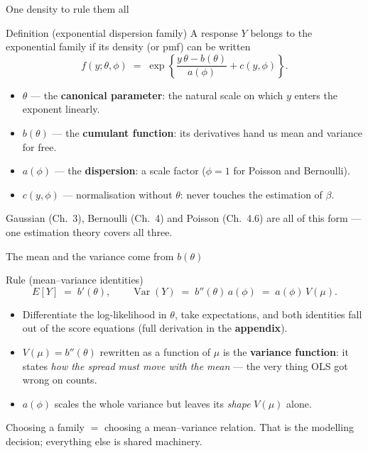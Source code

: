 \documentclass[aspectratio=169,11pt]{beamer}
\begin{document}
\begin{frame}{One density to rule them all}
  \footnotesize
  \begin{block}{Definition (exponential dispersion family)}
    \footnotesize
    A response $Y$ belongs to the exponential family if its density (or pmf) can be written
    \[
      f(y;\theta,\phi) \;=\; \exp\!\left\{ \frac{y\,\theta - b(\theta)}{a(\phi)} + c(y,\phi) \right\}.
    \]
  \end{block}
  \begin{readme}
    \begin{itemize}
      \item $\theta$ --- the \textbf{canonical parameter}: the natural scale on which
            $y$ enters the exponent linearly.
      \item $b(\theta)$ --- the \textbf{cumulant function}: its derivatives hand us
            mean and variance for free.
      \item $a(\phi)$ --- the \textbf{dispersion}: a scale factor
            ($\phi = 1$ for Poisson and Bernoulli).
      \item $c(y,\phi)$ --- normalisation without $\theta$: never touches the
            estimation of $\beta$.
    \end{itemize}
  \end{readme}
  \begin{takeaway}
    Gaussian (Ch.\ 3), Bernoulli (Ch.\ 4) and Poisson (Ch.\ 4.6) are all of this form ---
    one estimation theory covers all three.
  \end{takeaway}
\end{frame}

\begin{frame}{The mean and the variance come from $b(\theta)$}
  \begin{block}{Rule (mean--variance identities)}
    \[
      E[Y] \;=\; b'(\theta), \qquad
      \operatorname{Var}(Y) \;=\; b''(\theta)\, a(\phi) \;=\; a(\phi)\,V(\mu).
    \]
  \end{block}
  \begin{readme}
    \begin{itemize}
      \item Differentiate the log-likelihood in $\theta$, take expectations, and both
            identities fall out of the score equations (full derivation in the
            \textbf{appendix}).
      \item $V(\mu) = b''(\theta)$ rewritten as a function of $\mu$ is the
            \textbf{variance function}: it states \emph{how the spread must move with the
            mean} --- the very thing OLS got wrong on counts.
      \item $a(\phi)$ scales the whole variance but leaves its \emph{shape} $V(\mu)$ alone.
    \end{itemize}
  \end{readme}
  \begin{takeaway}
    Choosing a family $=$ choosing a mean--variance relation. That is the modelling
    decision; everything else is shared machinery.
  \end{takeaway}
\end{frame}
\end{document}
